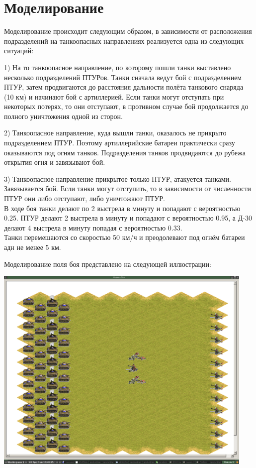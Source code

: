 \documentclass{cw1}
\begin{document}
\newpage
\section{Моделирование}
Моделирование происходит следующим образом, в зависимости от расположения подразделений на танкоопасных направлениях 
реализуется одна из следующих ситуаций:


1) На то танкоопасное направление, по которому пошли танки выставлено несколько
подразделений ПТУРов. Танки сначала ведут бой с подразделением ПТУР, затем продвигаются до
расстояния дальности полёта танкового снаряда (10 км) и начинают бой с артиллерией.
Если танки могут отступать при некоторых потерях, то они
отступают, в противном случае бой продолжается до полного уничтожения одной из сторон.

2) Танкоопасное направление, куда вышли танки, оказалось не прикрыто подразделением ПТУР.
Поэтому артиллерийские батареи практически сразу оказываются под огням танков.
Подразделения танков продвидаются до рубежа открытия огня и завязывают бой.

3) Танкоопасное направление прикрытое только ПТУР, атакуется танками. Завязывается бой.
Если танки могут отступить, то в зависимости от численности ПТУР они либо отступают, либо
уничтожают ПТУР.
\\
В ходе боя танки делают по 2 выстрела в минуту и попадают с вероятностью 0.25. ПТУР делают
2 выстрела в минуту и попадают с вероятностью 0.95, а Д-30 делают 4 выстрела в минуту
попадая с вероятностью 0.33.\\
Танки перемешаются со скоростью 50 км/ч и преодолевают под огнём батареи адн не менее 5
км.

Моделирование поля боя представлено на следующей иллюстрации:

\begin{center}
\includegraphics[height=100mm]{img2.png}
\end{center}
\end{document}
